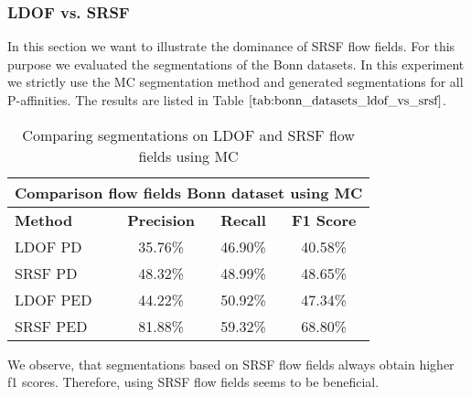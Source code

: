\subsubsection{LDOF vs. SRSF}
In this section we want to illustrate the dominance of SRSF flow fields. For this purpose we evaluated the segmentations of the Bonn datasets. In this experiment we strictly use the MC segmentation method and generated segmentations for all P-affinities. The results are listed in Table $\ref{tab:bonn_datasets_ldof_vs_srsf}$.
\begin{table}[H]
\centering
\begin{tabular}{|l|c|c|c|}
\hline
\multicolumn{4}{|c|}{Comparison flow fields Bonn dataset using MC}                        \\ \hline
\textbf{Method} & \textbf{Precision} & \textbf{Recall} & \textbf{F1 Score}  \\ \hline
LDOF PD & 35.76\% & 46.90\% & 40.58\% \\ \hline
SRSF PD & 48.32\% & 48.99\% & 48.65\% \\ \hline
LDOF PED & 44.22\% & 50.92\% & 47.34\% \\ \hline
SRSF PED & 81.88\% & 59.32\% & 68.80\% \\ \hline
\end{tabular}
\caption[LDOF vs. SRSF: Bonn Datasets]{Comparing segmentations on LDOF and SRSF flow fields using MC}
\label{tab:bonn_datasets_ldof_vs_srsf}
\end{table}
We observe, that segmentations based on SRSF flow fields always obtain higher f1 scores. Therefore, using SRSF flow fields seems to be beneficial.

